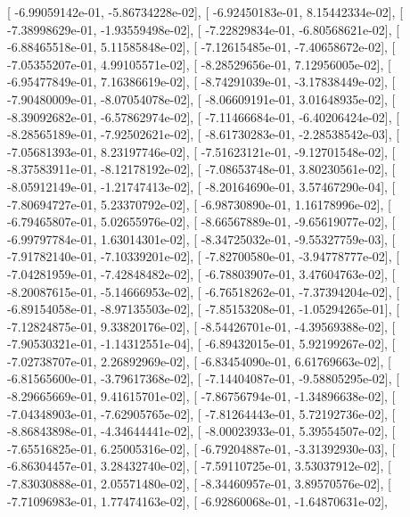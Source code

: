\documentclass{article}
\begin{document}
       [ -6.99059142e-01,  -5.86734228e-02],
       [ -6.92450183e-01,   8.15442334e-02],
       [ -7.38998629e-01,  -1.93559498e-02],
       [ -7.22829834e-01,  -6.80568621e-02],
       [ -6.88465518e-01,   5.11585848e-02],
       [ -7.12615485e-01,  -7.40658672e-02],
       [ -7.05355207e-01,   4.99105571e-02],
       [ -8.28529656e-01,   7.12956005e-02],
       [ -6.95477849e-01,   7.16386619e-02],
       [ -8.74291039e-01,  -3.17838449e-02],
       [ -7.90480009e-01,  -8.07054078e-02],
       [ -8.06609191e-01,   3.01648935e-02],
       [ -8.39092682e-01,  -6.57862974e-02],
       [ -7.11466684e-01,  -6.40206424e-02],
       [ -8.28565189e-01,  -7.92502621e-02],
       [ -8.61730283e-01,  -2.28538542e-03],
       [ -7.05681393e-01,   8.23197746e-02],
       [ -7.51623121e-01,  -9.12701548e-02],
       [ -8.37583911e-01,  -8.12178192e-02],
       [ -7.08653748e-01,   3.80230561e-02],
       [ -8.05912149e-01,  -1.21747413e-02],
       [ -8.20164690e-01,   3.57467290e-04],
       [ -7.80694727e-01,   5.23370792e-02],
       [ -6.98730890e-01,   1.16178996e-02],
       [ -6.79465807e-01,   5.02655976e-02],
       [ -8.66567889e-01,  -9.65619077e-02],
       [ -6.99797784e-01,   1.63014301e-02],
       [ -8.34725032e-01,  -9.55327759e-03],
       [ -7.91782140e-01,  -7.10339201e-02],
       [ -7.82700580e-01,  -3.94778777e-02],
       [ -7.04281959e-01,  -7.42848482e-02],
       [ -6.78803907e-01,   3.47604763e-02],
       [ -8.20087615e-01,  -5.14666953e-02],
       [ -6.76518262e-01,  -7.37394204e-02],
       [ -6.89154058e-01,  -8.97135503e-02],
       [ -7.85153208e-01,  -1.05294265e-01],
       [ -7.12824875e-01,   9.33820176e-02],
       [ -8.54426701e-01,  -4.39569388e-02],
       [ -7.90530321e-01,  -1.14312551e-04],
       [ -6.89432015e-01,   5.92199267e-02],
       [ -7.02738707e-01,   2.26892969e-02],
       [ -6.83454090e-01,   6.61769663e-02],
       [ -6.81565600e-01,  -3.79617368e-02],
       [ -7.14404087e-01,  -9.58805295e-02],
       [ -8.29665669e-01,   9.41615701e-02],
       [ -7.86756794e-01,  -1.34896638e-02],
       [ -7.04348903e-01,  -7.62905765e-02],
       [ -7.81264443e-01,   5.72192736e-02],
       [ -8.86843898e-01,  -4.34644441e-02],
       [ -8.00023933e-01,   5.39554507e-02],
       [ -7.65516825e-01,   6.25005316e-02],
       [ -6.79204887e-01,  -3.31392930e-03],
       [ -6.86304457e-01,   3.28432740e-02],
       [ -7.59110725e-01,   3.53037912e-02],
       [ -7.83030888e-01,   2.05571480e-02],
       [ -8.34460957e-01,   3.89570576e-02],
       [ -7.71096983e-01,   1.77474163e-02],
       [ -6.92860068e-01,  -1.64870631e-02],
\end{document}
